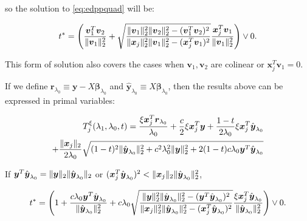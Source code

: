 so the solution to \eqref{eq:edppquad} will be:

\begin{equation}
    t^*=\left(\frac{\boldsymbol v_1^T\boldsymbol v_2}{\lVert\boldsymbol v_1\rVert_2^2}+\sqrt{\frac{\lVert\boldsymbol v_1\rVert_2^2\lVert\boldsymbol v_2\rVert_2^2-(\boldsymbol v_1^T\boldsymbol v_2)^2}{\lVert\boldsymbol x_j\rVert_2^2\lVert\boldsymbol v_1\rVert_2^2-(\boldsymbol x_j^T\boldsymbol v_1)^2}}\frac{\boldsymbol x_j^T\boldsymbol v_1}{\lVert\boldsymbol v_1\rVert_2^2}\right)\vee 0.
\end{equation}

This form of solution also covers the cases when $\boldsymbol v_1,\boldsymbol v_2$ are colinear or $\boldsymbol x_j^T \boldsymbol v_1=0$.

If we define $\boldsymbol r_{\lambda_0}\equiv \boldsymbol y-X\boldsymbol\beta_{\lambda_0}$ and $\hat{\boldsymbol y}_{\lambda_0}\equiv X\boldsymbol\beta_{\lambda_0}$, then the results above can be expressed in primal variables:

\begin{gather}
    \begin{aligned}
        T^\xi_j(\lambda_1,\lambda_0,t)= \frac{\xi \boldsymbol x_j^T \boldsymbol r_{\lambda_0}}{\lambda_0}+ \frac{c}{2}\xi\boldsymbol x_j^T \boldsymbol y+\frac{1-t}{2\lambda_0}\xi \boldsymbol x_j^T \hat{\boldsymbol y}_{\lambda_0}\\
        +\frac{\lVert\boldsymbol x_j\rVert_2}{2\lambda_0}\sqrt{(1-t)^2\lVert\hat{\boldsymbol y}_{\lambda_0}\rVert_2^2+c^2\lambda_0^2\lVert\boldsymbol y\rVert_2^2+2(1-t)c\lambda_0 \boldsymbol y^T\hat{\boldsymbol y}_{\lambda_0}}
    \end{aligned}
\end{gather}

If $\boldsymbol y^T \hat{\boldsymbol y}_{\lambda_0}=\lVert\boldsymbol y\rVert_2\lVert \hat{\boldsymbol y}_{\lambda_0}\rVert_2$ or $(\boldsymbol x_j^T\hat{\boldsymbol y}_{\lambda_0})^2<\lVert\boldsymbol x_j\rVert_2\lVert\hat{\boldsymbol y}_{\lambda_0}\rVert_2^2$,

\begin{equation}
    t^*=\left(1+\frac{c\lambda_0\boldsymbol y^T\hat{\boldsymbol y}_{\lambda_0}}{\lVert\hat{\boldsymbol y}_{\lambda_0}\rVert_2^2}+c\lambda_0\sqrt{\frac{\lVert\boldsymbol y\rVert_2^2\lVert\hat{\boldsymbol y}_{\lambda_0}\rVert_2^2-(\boldsymbol y^T\hat{\boldsymbol y}_{\lambda_0})^2}{\lVert\boldsymbol x_j\rVert_2^2\lVert\hat{\boldsymbol y}_{\lambda_0}\rVert_2^2-(\boldsymbol x_j^T\hat{\boldsymbol y}_{\lambda_0})^2}}\frac{\xi\boldsymbol x_j^T\hat{\boldsymbol y}_{\lambda_0}}{\lVert\hat{\boldsymbol y}_{\lambda_0}\rVert_2^2}\right)\vee 0.
\end{equation}

